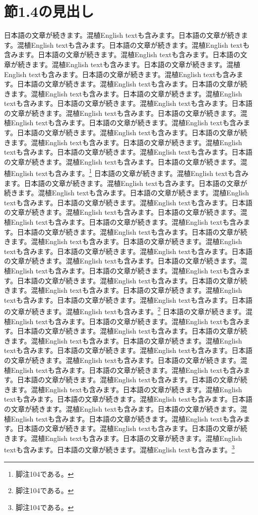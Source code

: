 \documentclass[pdflatex,book]{jlreq}
\begin{document}
\section{節1.4の見出し}
日本語の文章が続きます。混植English textも含みます。日本語の文章が続きます。混植English textも含みます。日本語の文章が続きます。混植English textも含みます。日本語の文章が続きます。混植English textも含みます。日本語の文章が続きます。混植English textも含みます。日本語の文章が続きます。混植English textも含みます。日本語の文章が続きます。混植English textも含みます。日本語の文章が続きます。混植English textも含みます。日本語の文章が続きます。混植English textも含みます。日本語の文章が続きます。混植English textも含みます。日本語の文章が続きます。混植English textも含みます。日本語の文章が続きます。混植English textも含みます。日本語の文章が続きます。混植English textも含みます。日本語の文章が続きます。混植English textも含みます。日本語の文章が続きます。混植English textも含みます。日本語の文章が続きます。混植English textも含みます。日本語の文章が続きます。混植English textも含みます。日本語の文章が続きます。混植English textも含みます。日本語の文章が続きます。混植English textも含みます。日本語の文章が続きます。混植English textも含みます。\footnote{脚注104である。}
日本語の文章が続きます。混植English textも含みます。日本語の文章が続きます。混植English textも含みます。日本語の文章が続きます。混植English textも含みます。日本語の文章が続きます。混植English textも含みます。日本語の文章が続きます。混植English textも含みます。日本語の文章が続きます。混植English textも含みます。日本語の文章が続きます。混植English textも含みます。日本語の文章が続きます。混植English textも含みます。日本語の文章が続きます。混植English textも含みます。日本語の文章が続きます。混植English textも含みます。日本語の文章が続きます。混植English textも含みます。日本語の文章が続きます。混植English textも含みます。日本語の文章が続きます。混植English textも含みます。日本語の文章が続きます。混植English textも含みます。日本語の文章が続きます。混植English textも含みます。日本語の文章が続きます。混植English textも含みます。日本語の文章が続きます。混植English textも含みます。日本語の文章が続きます。混植English textも含みます。日本語の文章が続きます。混植English textも含みます。日本語の文章が続きます。混植English textも含みます。\footnote{脚注104である。}
日本語の文章が続きます。混植English textも含みます。日本語の文章が続きます。混植English textも含みます。日本語の文章が続きます。混植English textも含みます。日本語の文章が続きます。混植English textも含みます。日本語の文章が続きます。混植English textも含みます。日本語の文章が続きます。混植English textも含みます。日本語の文章が続きます。混植English textも含みます。日本語の文章が続きます。混植English textも含みます。日本語の文章が続きます。混植English textも含みます。日本語の文章が続きます。混植English textも含みます。日本語の文章が続きます。混植English textも含みます。日本語の文章が続きます。混植English textも含みます。日本語の文章が続きます。混植English textも含みます。日本語の文章が続きます。混植English textも含みます。日本語の文章が続きます。混植English textも含みます。日本語の文章が続きます。混植English textも含みます。日本語の文章が続きます。混植English textも含みます。日本語の文章が続きます。混植English textも含みます。日本語の文章が続きます。混植English textも含みます。日本語の文章が続きます。混植English textも含みます。\footnote{脚注104である。}
\end{document}
